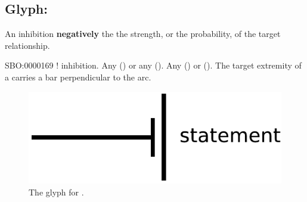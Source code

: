 
\subsection{Glyph: }\label{sec:inhibition}
\color{blue}

An inhibition \textbf{negatively}  the the strength, or the probability, of the target relationship. 

\begin{glyphDescription}
 \glyphSboTerm SBO:0000169 ! inhibition.
 \glyphOrigin Any  () or any  ().
 \glyphTarget Any  () or  ().
 \glyphEndPoint The target extremity of a  carries a bar perpendicular to the arc.
 \end{glyphDescription}

\begin{figure}[H]
  \centering
  \includegraphics[scale = 0.5]{images/inhibition}
  \caption{The \PD glyph for .}
  \label{fig:inhibition}
\end{figure}


